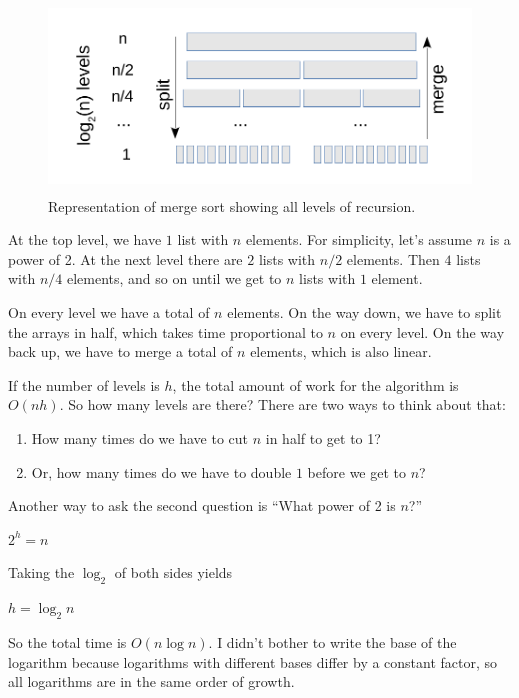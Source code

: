 \documentclass[12pt]{book}
\theoremstyle{exercise}
\begin{document}
\begin{figure}
\centering
\includegraphics[height=2in]{figs/merge_sort2.pdf}
\caption{Representation of merge sort showing all levels of recursion.}
\label{fig-sort2}
\end{figure}

At the top level, we have $1$ list with $n$ elements. 
For simplicity, let's assume $n$ is a power of 2.
At the next level there are $2$ lists with $n/2$ elements.
Then $4$ lists with $n/4$ elements, and so on until we get
to $n$ lists with $1$ element.

On every level we have a total of $n$ elements. On the way down,
we have to split the arrays in half, which takes time proportional to
$n$ on every level. On the way back up, we have to merge a total
of $n$ elements, which is also linear.

If the number of levels is $h$, the total amount of work for the
algorithm is $O(nh)$. So how many levels are there? There are two
ways to think about that:

\begin{enumerate}

\item
  How many times do we have to cut $n$ in half to get to 1?

\item
   Or, how many times do we have to double $1$ before we get to $n$?

\end{enumerate}

Another way to ask the second question is ``What power of 2 is
$n$?''

$2^h = n$

Taking the $\log_2$ of both sides yields

$h = \log_2 n$

So the total time is $O(n \log n)$. I didn't bother to write the
base of the logarithm because logarithms with different bases differ by
a constant factor, so all logarithms are in the same order of growth.
\end{document}

